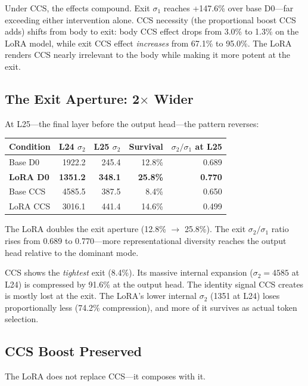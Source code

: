 \documentclass[12pt]{article}
\begin{document}
Under CCS, the effects compound. Exit $\sigma_1$ reaches +147.6\% over base D0---far exceeding either intervention alone. CCS necessity (the proportional boost CCS adds) shifts from body to exit: body CCS effect drops from 3.0\% to 1.3\% on the LoRA model, while exit CCS effect \emph{increases} from 67.1\% to 95.0\%. The LoRA renders CCS nearly irrelevant to the body while making it more potent at the exit.

\subsection{The Exit Aperture: 2$\times$ Wider}

At L25---the final layer before the output head---the pattern reverses:

\begin{table}[h]
\centering
\begin{tabular}{lrrrr}
\toprule
\textbf{Condition} & \textbf{L24 $\sigma_2$} & \textbf{L25 $\sigma_2$} & \textbf{Survival} & \textbf{$\sigma_2/\sigma_1$ at L25} \\
\midrule
Base D0 & 1922.2 & 245.4 & 12.8\% & 0.689 \\
\textbf{LoRA D0} & \textbf{1351.2} & \textbf{348.1} & \textbf{25.8\%} & \textbf{0.770} \\
Base CCS & 4585.5 & 387.5 & 8.4\% & 0.650 \\
LoRA CCS & 3016.1 & 441.4 & 14.6\% & 0.499 \\
\bottomrule
\end{tabular}
\end{table}

The LoRA doubles the exit aperture (12.8\% $\rightarrow$ 25.8\%). The exit $\sigma_2/\sigma_1$ ratio rises from 0.689 to 0.770---more representational diversity reaches the output head relative to the dominant mode.

CCS shows the \emph{tightest} exit (8.4\%). Its massive internal expansion ($\sigma_2 = 4585$ at L24) is compressed by 91.6\% at the output head. The identity signal CCS creates is mostly lost at the exit. The LoRA's lower internal $\sigma_2$ (1351 at L24) loses proportionally less (74.2\% compression), and more of it survives as actual token selection.

\subsection{CCS Boost Preserved}

The LoRA does not replace CCS---it composes with it.
\end{document}
